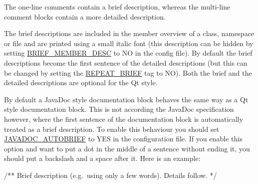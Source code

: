 The one-\/line comments contain a brief description, whereas the multi-\/line comment blocks contain a more detailed description.

The brief descriptions are included in the member overview of a class, namespace or file and are printed using a small italic font (this description can be hidden by setting \hyperlink{config_cfg_brief_member_desc}{BRIEF\_\-MEMBER\_\-DESC} to {\ttfamily NO} in the config file). By default the brief descriptions become the first sentence of the detailed descriptions (but this can be changed by setting the \hyperlink{config_cfg_repeat_brief}{REPEAT\_\-BRIEF} tag to {\ttfamily NO}). Both the brief and the detailed descriptions are optional for the Qt style.

By default a JavaDoc style documentation block behaves the same way as a Qt style documentation block. This is not according the JavaDoc specification however, where the first sentence of the documentation block is automatically treated as a brief description. To enable this behaviour you should set \hyperlink{config_cfg_javadoc_autobrief}{JAVADOC\_\-AUTOBRIEF} to YES in the configuration file. If you enable this option and want to put a dot in the middle of a sentence without ending it, you should put a backslash and a space after it. Here is an example: \begin{DoxyVerb}
  /** Brief description (e.g.\ using only a few words). Details follow. */
\end{DoxyVerb}


